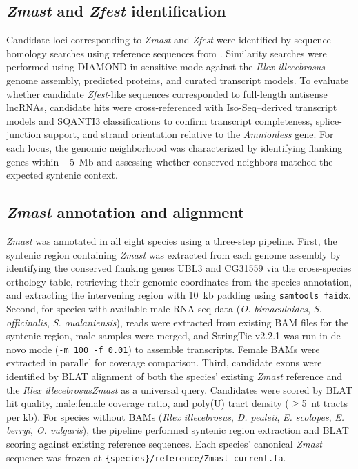\documentclass[12pt]{article}
\newcommand{\citep}{\parencite}
\newcommand{\illex}{\textit{Illex illecebrosus}\xspace}
\begin{document}
\subsection*{\textit{Zmast} and \textit{Zfest} identification}

Candidate loci corresponding to \textit{Zmast} and \textit{Zfest}
were identified by sequence homology searches
using reference sequences from \textcite{papanicolaou2024z}.
Similarity searches were performed using DIAMOND \citep{buchfink2015diamond}
in sensitive mode against the \illex genome assembly,
predicted proteins, and curated transcript models.
To evaluate whether candidate \textit{Zfest}-like sequences
corresponded to full-length antisense lncRNAs,
candidate hits were cross-referenced with Iso-Seq--derived transcript models
and SQANTI3 classifications \citep{Tardaguila2018SQANTI}
to confirm transcript completeness, splice-junction support,
and strand orientation relative to the \textit{Amnionless} gene.
For each locus, the genomic neighborhood was characterized
by identifying flanking genes within $\pm$5~Mb
and assessing whether conserved neighbors matched
the expected syntenic context.

\subsection*{\textit{Zmast} annotation and alignment}

\textit{Zmast} was annotated in all eight species using a three-step pipeline.
First, the syntenic region containing \textit{Zmast} was extracted
from each genome assembly by identifying the conserved flanking genes
UBL3 and CG31559 via the cross-species orthology table,
retrieving their genomic coordinates from the species annotation,
and extracting the intervening region with 10~kb padding
using \texttt{samtools faidx}.
Second, for species with available male RNA-seq data
(\textit{O. bimaculoides}, \textit{S. officinalis}, \textit{S. oualaniensis}),
reads were extracted from existing BAM files for the syntenic region,
male samples were merged, and StringTie v2.2.1 was run
in de novo mode (\texttt{-m 100 -f 0.01})
to assemble transcripts.
Female BAMs were extracted in parallel for coverage comparison.
Third, candidate exons were identified by BLAT alignment
of both the species' existing \textit{Zmast} reference
and the \illex \textit{Zmast} as a universal query.
Candidates were scored by BLAT hit quality,
male:female coverage ratio, and poly(U) tract density
($\geq$5~nt tracts per kb).
For species without BAMs (\illex, \textit{D. pealeii},
\textit{E. scolopes}, \textit{E. berryi}, \textit{O. vulgaris}),
the pipeline performed syntenic region extraction
and BLAT scoring against existing reference sequences.
Each species' canonical \textit{Zmast} sequence was frozen
at \texttt{\{species\}/reference/Zmast\_current.fa}.
\end{document}
